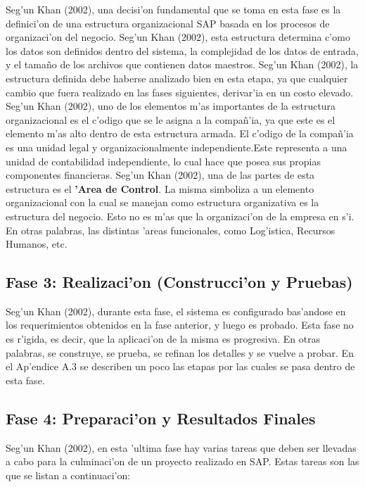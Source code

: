 \indent  Seg'un Khan (2002), una decisi'on fundamental que se toma en esta fase es la definici'on de una estructura organizacional SAP basada en los procesos de organizaci'on del negocio. 
\newline
\newline
\indent Seg'un Khan (2002), esta estructura determina c'omo los datos son definidos dentro del sistema, la complejidad de los datos de entrada, y el tama\~no de los archivos que contienen datos maestros. 
\newline
\newline
\indent Seg'un Khan (2002), la estructura definida debe haberse analizado bien en esta etapa, ya que cualquier cambio que fuera realizado en las fases siguientes, derivar'ia en un costo elevado.
\newline
\newline
\indent Seg'un Khan (2002), uno de los elementos m'as importantes de la estructura organizacional es el c'odigo que se le asigna a la compa\~n'ia, ya que este es el elemento m'as alto dentro de esta estructura armada. El c'odigo de la compa\~n'ia es una unidad legal y organizacionalmente independiente.Este representa a una unidad de contabilidad independiente, lo cual hace que posea sus propias componentes financieras.
\newline
\newline
\indent Seg'un Khan (2002), una de las partes de esta estructura es el \textbf{'Area de Control}. La misma simboliza a un elemento organizacional con la cual se manejan como estructura organizativa es la estructura del negocio. Esto no es m'as que la organizaci'on de la empresa en s'i. En otras palabras, las distintas 'areas funcionales, como Log'istica, Recursos Humanos, etc.
\subsection{Fase 3: Realizaci'on (Construcci'on y Pruebas)}
	Seg'un Khan (2002), durante esta fase, el sistema es configurado bas'andose en los requerimientos obtenidos en la fase anterior, y luego es probado. Esta fase no es r'igida, es decir, que la aplicaci'on de la misma es progresiva. En otras palabras, se construye, se prueba, se refinan los detalles y se vuelve a probar. En el Ap'endice A.3 se describen un poco las etapas por las cuales se pasa dentro de esta fase.

\subsection{Fase 4: Preparaci'on y Resultados Finales}
	Seg'un Khan (2002), en esta 'ultima fase hay varias tareas que deben ser llevadas a cabo para la culminaci'on de un proyecto realizado en SAP. Estas tareas son las que se listan a continuaci'on:
	

